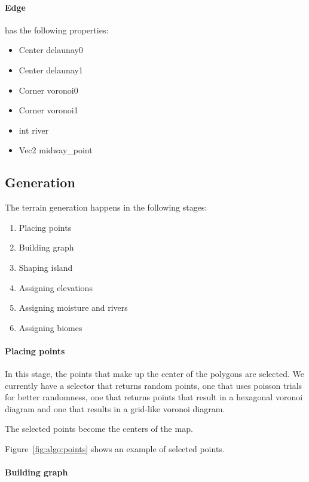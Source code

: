 \paragraph{Edge} has the following properties:

\begin{itemize}
	\item Center delaunay0
	\item Center delaunay1
	\item Corner voronoi0
	\item Corner voronoi1
	\item int river
	\item Vec2 midway\_point
\end{itemize}

\subsection{Generation}

The terrain generation happens in the following stages:

\begin{enumerate}
	\item Placing points
	\item Building graph
	\item Shaping island
	\item Assigning elevations
	\item Assigning moisture and rivers
	\item Assigning biomes
\end{enumerate}

\paragraph{Placing points}

In this stage, the points that make up the center of the polygons are selected.
We currently have a selector that returns random points, one that uses poisson trials for better randomness, one that returns points that result in a hexagonal voronoi diagram and one that results in a grid-like voronoi diagram.

The selected points become the centers of the map.

Figure~\ref{fig:algo:points} shows an example of selected points.

\paragraph{Building graph}

